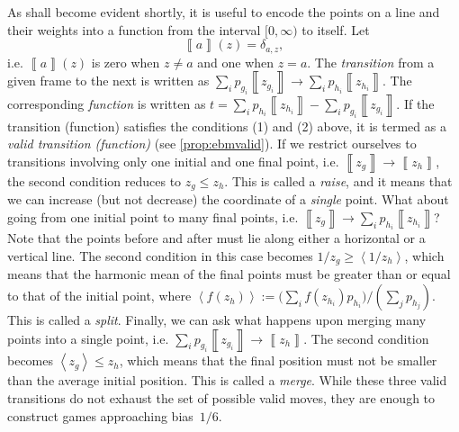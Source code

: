 \documentclass{theoretics}
\begin{document}
%

%
As shall become evident shortly, it is useful to
encode the points on a line and their weights into a function from the
interval $[0,\infty)$ to itself. Let
\begin{equation}
  \left\llbracket a\right\rrbracket (z)=\delta_{a,z},\label{eq:MochonBracketPointGame}
\end{equation}
i.e. $\left\llbracket a\right\rrbracket (z)$
is zero when $z\neq a$ and one when $z=a$.
The \emph{transition} from a given frame to the next is written
as $\sum_{i}p_{g_{i}}\left\llbracket z_{g_{i}}\right\rrbracket \to\sum_{i}p_{h_{i}}\left\llbracket z_{h_{i}}\right\rrbracket $.
The corresponding
\emph{function} is written as $t=\sum_{i}p_{h_{i}}\left\llbracket z_{h_{i}}\right\rrbracket -\sum_{i}p_{g_{i}}\left\llbracket z_{g_{i}}\right\rrbracket $.
If the transition (function) satisfies the conditions (1) and (2)
above, it
is termed as a \emph{valid transition (function)} (see \cref{prop:ebmvalid}). %
If we restrict ourselves to transitions involving only one initial
and one final point, i.e. $\left\llbracket z_{g}\right\rrbracket \to\left\llbracket z_{h}\right\rrbracket $,
the second condition reduces to $z_{g}\le z_{h}$. This is called a \emph{raise}, and it means that we can
increase (but not decrease) the coordinate of a \emph{single} point. %
What about going from one
initial point to many final points, i.e. $\left\llbracket z_{g}\right\rrbracket \to\sum_{i}p_{h_{i}}\left\llbracket z_{h_{i}}\right\rrbracket $?
Note that the points before and after must lie along either a horizontal
or a vertical line. The second condition in this case becomes $1/z_{g}\ge\left\langle 1/z_{h}\right\rangle $,
which means that the harmonic mean
of the final points must be greater than or equal to that of the initial
point, where $\left\langle f(z_{h})\right\rangle:=\Big(\sum_{i}f(z_{h_{i}})p_{h_{i}}\Big)/ \left(\sum_{j}p_{h_j}\right)$.
This is called a \emph{split}. Finally, we can ask what happens upon
merging many points into a single point, i.e. $\sum_{i}p_{g_{i}}\left\llbracket z_{g_{i}}\right\rrbracket \to\left\llbracket z_{h}\right\rrbracket $.
The second condition becomes $\left\langle z_{g}\right\rangle \le z_{h}$,
which means that the final position must not be smaller than the average initial
position. This is called a \emph{merge}. While these three valid transitions
do not exhaust the set of possible valid moves, they are enough to construct games
approaching bias~$1/6$.
\end{document}
